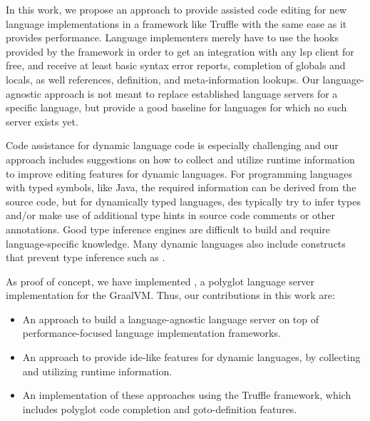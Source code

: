 \documentclass[sigplan,10pt,screen]{acmart}
\begin{document}
In this work, we propose an approach to provide assisted code editing for new
language implementations in a framework like Truffle with the same ease as it
provides performance. Language implementers merely have to use the hooks
provided by the framework in order to get an integration with any \ac{lsp}
client for free, and receive at least basic syntax error reports, completion of
globals and locals, as well references, definition, and meta-information lookups.
Our language-agnostic approach is not meant to replace established language servers for a
specific language, but provide a good baseline for languages for which no such
server exists yet.



Code assistance for dynamic language code is especially challenging and our
approach includes suggestions on how to collect and utilize runtime information
to improve editing features for dynamic languages. For programming languages
with typed symbols, like Java, the required information can be derived from the
source code, but for dynamically typed languages, \acp{de} typically try to
infer types and/or make use of additional type hints in source code comments or
other annotations. Good type inference engines are difficult to build and
require language-specific knowledge. Many dynamic languages also include
constructs that prevent type inference such as .

As proof of concept, we have implemented \graallsp, a polyglot language server
implementation for the GraalVM. Thus, our contributions in this work are:
\begin{itemize}
\item An approach to build a language-agnostic language server on top of
  performance-focused language implementation frameworks.
\item An approach to provide \acs{ide}-like features for dynamic languages, by
  collecting and utilizing runtime information.
\item An implementation of these approaches using the Truffle framework, which
  includes polyglot code completion and goto-definition features.
\end{itemize}
\end{document}
